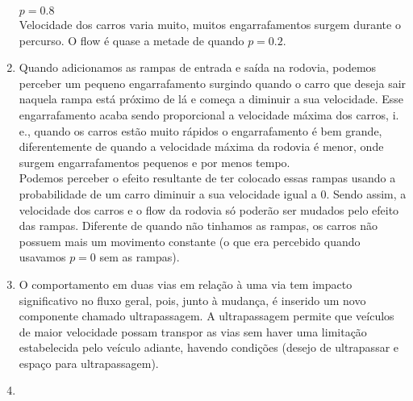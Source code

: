 \documentclass[11pt]{extarticle}
\begin{document}
\begin{enumerate}
  $p = 0.8$ \\
  Velocidade dos carros varia muito, muitos engarrafamentos surgem durante o percurso. O flow é quase a metade de quando $p = 0.2$.
\item                           %
  Quando adicionamos as rampas de entrada e saída na rodovia, podemos perceber um pequeno engarrafamento surgindo quando o carro que deseja sair naquela rampa está próximo de lá e começa a diminuir a sua velocidade. Esse engarrafamento acaba sendo proporcional a velocidade máxima dos carros, i. e., quando os carros estão muito rápidos o engarrafamento é bem grande, diferentemente de quando a velocidade máxima da rodovia é menor, onde surgem engarrafamentos pequenos e por menos tempo. \\
  Podemos perceber o efeito resultante de ter colocado essas rampas usando a probabilidade de um carro diminuir a sua velocidade igual a 0. Sendo assim, a velocidade dos carros e o flow da rodovia só poderão ser mudados pelo efeito das rampas. Diferente de quando não tinhamos as rampas, os carros não possuem mais um movimento constante (o que era percebido quando usavamos $p = 0$ sem as rampas). 
\item                           %
  O comportamento em duas vias em relação à uma via tem impacto significativo no fluxo geral, pois, junto à mudança, é inserido um novo componente chamado ultrapassagem.
  A ultrapassagem permite que veículos de maior velocidade possam transpor as vias sem haver uma limitação estabelecida pelo veículo adiante, havendo condições (desejo de ultrapassar e espaço para ultrapassagem).
\item                           %
  
\end{enumerate}
\end{document}

